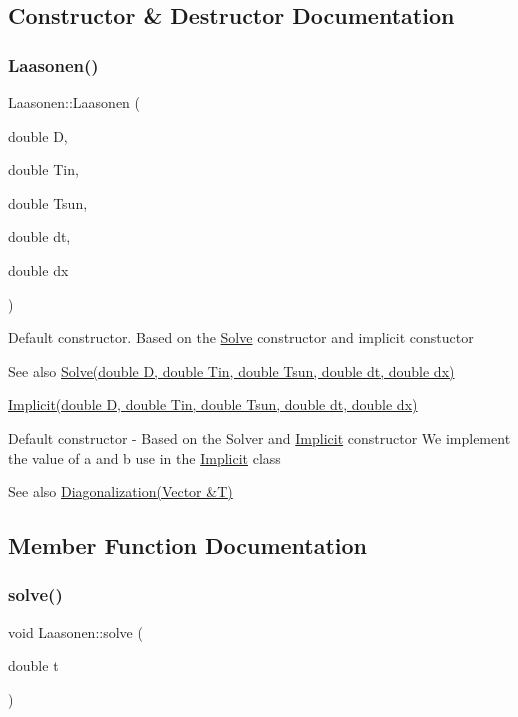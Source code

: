 \subsection{Constructor \& Destructor Documentation}
\mbox{\label{class_laasonen_ad20d5e371558ef7c4f04f730daef0049}} 
\subsubsection{\texorpdfstring{Laasonen()}{Laasonen()}}
{\footnotesize\ttfamily Laasonen\+::\+Laasonen (\begin{DoxyParamCaption}\item[{double}]{D,  }\item[{double}]{Tin,  }\item[{double}]{Tsun,  }\item[{double}]{dt,  }\item[{double}]{dx }\end{DoxyParamCaption})}

Default constructor. Based on the \hyperlink{class_solve}{Solve} constructor and implicit constuctor \begin{DoxySeeAlso}{See also}
\hyperlink{class_solve_a1e0efad6dcf6b09759dd38df7aa08db8}{Solve(double D, double Tin, double Tsun, double dt, double dx)} 

\hyperlink{class_implicit_afe5ef51232ab8925009f584c679bdfce}{Implicit(double D, double Tin, double Tsun, double dt, double dx)}
\end{DoxySeeAlso}
Default constructor -\/ Based on the Solver and \hyperlink{class_implicit}{Implicit} constructor We implement the value of a and b use in the \hyperlink{class_implicit}{Implicit} class \begin{DoxySeeAlso}{See also}
\hyperlink{class_implicit_a572fff2232977c83c432f993f37a7853}{Diagonalization(\+Vector \&\+T)} 
\end{DoxySeeAlso}


\subsection{Member Function Documentation}
\mbox{\label{class_laasonen_aaa49ab7d15fbfef94a57a0e89977d1c6}} 
\subsubsection{\texorpdfstring{solve()}{solve()}}
{\footnotesize\ttfamily void Laasonen\+::solve (\begin{DoxyParamCaption}\item[{double}]{t }\end{DoxyParamCaption})\hspace{0.3cm}{\ttfamily [virtual]}}

